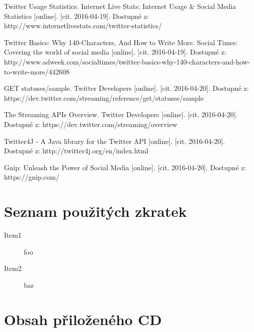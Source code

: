 \documentclass[thesis=B,czech]{FITthesis}[2012/06/26]
\begin{document}
\begin{thebibliography}{1}
Twitter Usage Statistics. Internet Live Stats: Internet Usage \& Social Media Statistics [online]. [cit. 2016-04-19]. Dostupné z: http://www.internetlivestats.com/twitter-statistics/

Twitter Basics: Why 140-Characters, And How to Write More. Social Times: Covering the world of social media [online]. [cit. 2016-04-19]. Dostupné z: http://www.adweek.com/socialtimes/twitter-basics-why-140-characters-and-how-to-write-more/442608

GET statuses/sample. Twitter Developers [online]. [cit. 2016-04-20]. Dostupné z: https://dev.twitter.com/streaming/reference/get/statuses/sample

The Streaming APIs Overview. Twitter Developers [online]. [cit. 2016-04-20]. Dostupné z: https://dev.twitter.com/streaming/overview

Twitter4J - A Java library for the Twitter API [online]. [cit. 2016-04-20]. Dostupné z: http://twitter4j.org/en/index.html

Gnip: Unleash the Power of Social Media [online]. [cit. 2016-04-20]. Dostupné z: https://gnip.com/

  
\end{thebibliography}



\appendix

\chapter{Seznam použitých zkratek}
\begin{description}
	\item[Item1] foo
	\item[Item2] bar
\end{description}

\chapter{Obsah přiloženého CD}


\begin{figure}
\end{figure}
\end{document}
